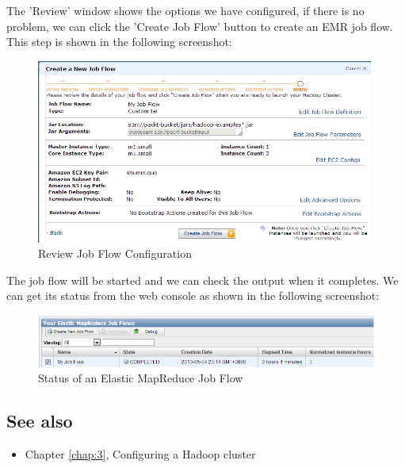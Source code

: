 The 'Review' window shows the options we have configured, if there is no problem, we can click the 'Create Job Flow' button to create an EMR job flow. This step is shown in the following screenshot:
\begin{figure}[ht]
  \centering
  \includegraphics[width=.95\textwidth]{figs/5163os_08_27.png}
  \caption{Review Job Flow Configuration}\label{fig:aws.elasticmapred.flow.review}
\end{figure} 
The job flow will be started and we can check the output when it completes. We can get its status from the web console as shown in the following screenshot:
\begin{figure}[ht]
  \centering
  \includegraphics[width=.95\textwidth]{figs/5163os_08_28.png}
  \caption{Status of an Elastic MapReduce Job Flow}\label{fig:aws.elasticmapred.flow.status}
\end{figure} 
\subsection*{See also}
\begin{itemize}
  \item Chapter \ref{chap:3}, Configuring a Hadoop cluster
\end{itemize}
